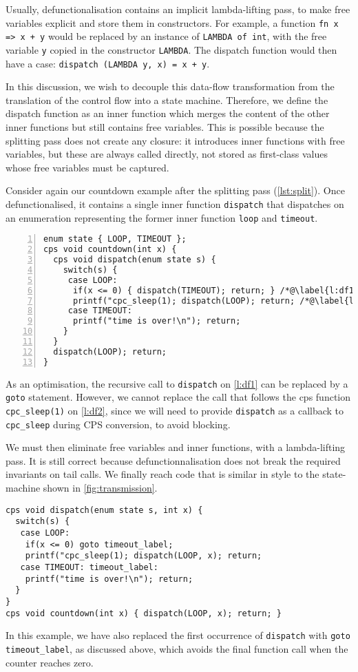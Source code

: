 \documentclass[a4paper]{llncs}
\begin{document}
Usually, defunctionalisation contains an implicit lambda-lifting pass, to make
free variables explicit and store them in constructors.  For example, a function
\texttt{fn x => x + y} would be replaced by an instance of \texttt{LAMBDA of int},
with the free variable \texttt{y} copied in the constructor \texttt{LAMBDA}.  The
dispatch function would then have a case: \texttt{dispatch (LAMBDA y, x) = x + y}.

In this discussion, we wish to decouple this data-flow transformation from the
translation of the control flow into a state machine.  Therefore, we define the
dispatch function as an inner function which merges the content of the other
inner functions but still contains free variables.  This is possible because the
splitting pass does not create any closure: it introduces inner functions with
free variables, but these are always called directly, not stored as first-class
values whose free variables must be captured.

Consider again our countdown example after the splitting pass
(\cref{lst:split}).  Once defunctionalised, it contains a single inner function
\texttt{dispatch} that dispatches on an enumeration representing the former inner
function \texttt{loop} and \texttt{timeout}.
\begin{lstlisting}[numbers=left]
enum state { LOOP, TIMEOUT };
cps void countdown(int x) {
  cps void dispatch(enum state s) {
    switch(s) {
     case LOOP:
      if(x <= 0) { dispatch(TIMEOUT); return; } /*@\label{l:df1}@*/
      printf("cpc_sleep(1); dispatch(LOOP); return; /*@\label{l:df2}@*/
     case TIMEOUT:
      printf("time is over!\n"); return;
    }
  }
  dispatch(LOOP); return;
}
\end{lstlisting}
As an optimisation, the recursive call to \texttt{dispatch} on \cref{l:df1} can be
replaced by a \texttt{goto} statement.  However, we cannot replace the call that
follows the cps function \texttt{cpc\_sleep(1)} on \cref{l:df2}, since we will need
to provide \texttt{dispatch} as a callback to \texttt{cpc\_sleep} during CPS
conversion, to avoid blocking.

We must then eliminate free variables and inner functions, with a lambda-lifting
pass.  It is still correct because defunctionnalisation does not break the
required invariants on tail calls.  We finally reach code that is similar in
style to the state-machine shown in \cref{fig:transmission}.
\begin{lstlisting}
cps void dispatch(enum state s, int x) {
  switch(s) {
   case LOOP:
    if(x <= 0) goto timeout_label;
    printf("cpc_sleep(1); dispatch(LOOP, x); return;
   case TIMEOUT: timeout_label:
    printf("time is over!\n"); return;
  }
}
cps void countdown(int x) { dispatch(LOOP, x); return; }
\end{lstlisting}
In this example, we have also replaced the first occurrence of \texttt{dispatch}
with \texttt{goto timeout\_\-label}, as discussed above, which avoids the final
function call when the counter reaches zero.
\end{document}
